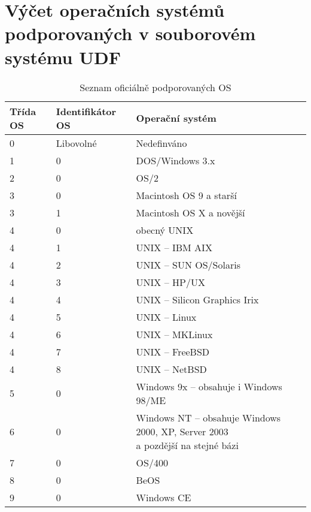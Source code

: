 \chapter{Výčet operačních systémů podporovaných v souborovém systému UDF}
\label{ch:podpora}
\begin{table}[h]
    \centering
    \begin{tabular}{ | l | l | l | }
        \hline
        Třída OS& Identifikátor OS  & Operační systém  \\ \hline\hline
        0       & Libovolné         & Nedefinváno \\ \hline 
        1       & 0                 & DOS/Windows 3.x\\ \hline 
        2       & 0                 & OS/2\\ \hline 
        3       & 0                 & Macintosh OS 9 a starší\\ \hline 
        3       & 1                 & Macintosh OS X a novější\\ \hline 
        4       & 0                 & obecný UNIX\\ \hline 
        4       & 1                 & UNIX -- IBM AIX\\ \hline 
        4       & 2                 & UNIX -- SUN OS/Solaris\\ \hline 
        4       & 3                 & UNIX -- HP/UX\\ \hline 
        4       & 4                 & UNIX -- Silicon Graphics Irix\\ \hline 
        4       & 5                 & UNIX -- Linux\\ \hline 
        4       & 6                 & UNIX -- MKLinux\\ \hline 
        4       & 7                 & UNIX -- FreeBSD\\ \hline 
        4       & 8                 & UNIX -- NetBSD\\ \hline 
        5       & 0                 & Windows 9x -- obsahuje i Windows 98/ME\\ \hline 
        6       & 0                 & \makecell{Windows NT -- obsahuje Windows 2000, XP, Server 2003\\ a pozdější na stejné bázi}\\ \hline 
        7       & 0                 & OS/400\\ \hline 
        8       & 0                 & BeOS\\ \hline 
        9       & 0                 & Windows CE\\ \hline 
    \end{tabular}
    \caption{Seznam oficiálně podporovaných OS\label{tab:os-types}}
\end{table}


